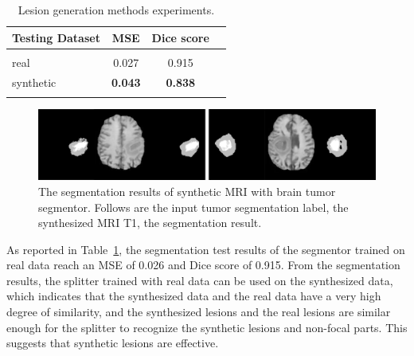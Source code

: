 \documentclass[runningheads]{llncs}
\begin{document}
\begin{table}
	\begin{center}
		\caption{Lesion generation methods experiments.}
		\label{label_test}
		\begin{tabular}{lccc}
			\hline
			\rule{0pt}{12pt}
			Testing Dataset &MSE   &Dice score
			\\
			\hline
			\\[-6pt]
			real 		   				&0.027 &0.915 \\							
			synthetic     			&\textbf{0.043} &\textbf{0.838} \\
			\hline
			\\[-6pt]
		\end{tabular}
	\end{center}
\end{table}
\begin{figure}[thbp!]
	\centering
	\includegraphics[width=0.65\linewidth]{figures/seg_res}
	\caption{The segmentation results of synthetic MRI with brain tumor segmentor. Follows are the input tumor segmentation label, the synthesized MRI T1, the segmentation result.}
	\label{seg_res}
\end{figure}

As reported in Table~\ref{label_test}, the segmentation test results of the segmentor trained on real data reach an MSE of 0.026 and Dice score of 0.915. From the segmentation results, the splitter trained with real data can be used on the synthesized data, which indicates that the synthesized data and the real data have a very high degree of similarity, and the synthesized lesions and the real lesions are similar enough for the splitter to recognize the synthetic lesions and non-focal parts. This suggests that synthetic lesions are effective.
\end{document}
